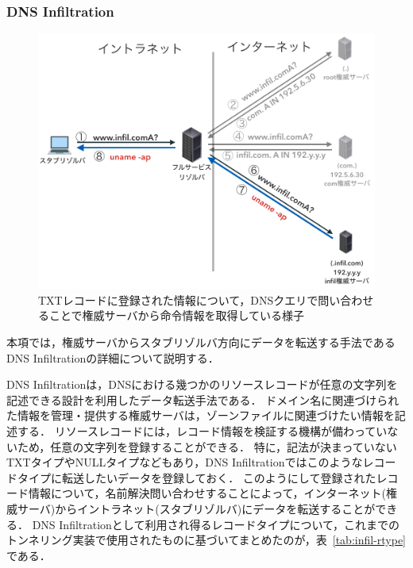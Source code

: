 \subsubsection{DNS Infiltration}
\label{sec:dns-infiltration}

\begin{figure}[bhtp]
 \centering
 \includegraphics[scale=0.6]{figure/dns-infiltration.png}
 \caption[DNS Infiltrationの概略図]{TXTレコードに登録された情報について，DNSクエリで問い合わせることで権威サーバから命令情報を取得している様子}
 \label{fig:dns-infiltration}
\end{figure}

本項では，権威サーバからスタブリゾルバ方向にデータを転送する手法であるDNS Infiltrationの詳細について説明する．

DNS Infiltrationは，DNSにおける幾つかのリソースレコードが任意の文字列を記述できる設計を利用したデータ転送手法である．
ドメイン名に関連づけられた情報を管理・提供する権威サーバは，ゾーンファイルに関連づけたい情報を記述する．
リソースレコードには，レコード情報を検証する機構が備わっていないため，任意の文字列を登録することができる．
特に，記法が決まっていないTXTタイプやNULLタイプなどもあり，DNS Infiltrationではこのようなレコードタイプに転送したいデータを登録しておく．
このようにして登録されたレコード情報について，名前解決問い合わせすることによって，インターネット(権威サーバ)からイントラネット(スタブリゾルバ)にデータを転送することができる．
DNS Infiltrationとして利用され得るレコードタイプについて，これまでのトンネリング実装で使用されたものに基づいてまとめたのが，表~\ref{tab:infil-rtype}である．

